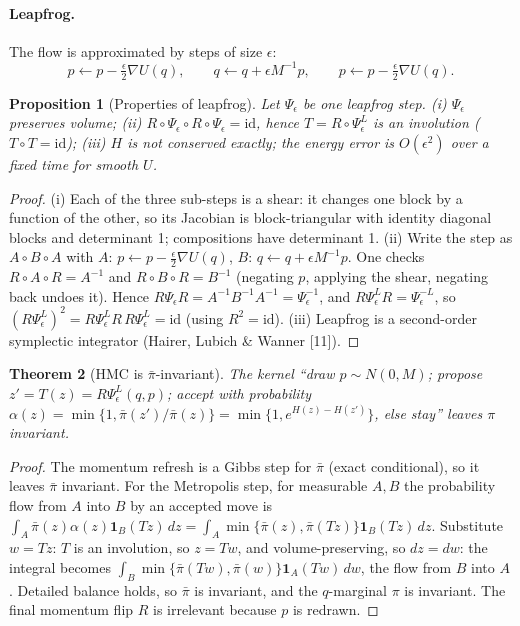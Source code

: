 \documentclass[11pt]{article}
\newtheorem{theorem}{Theorem}[section]
\newtheorem{proposition}[theorem]{Proposition}
\theoremstyle{definition}
\theoremstyle{remark}
\newcommand{\one}{\mathbf 1}
\begin{document}
\paragraph{Leapfrog.} The flow is approximated by steps of size $\epsilon$:
\[
p\leftarrow p-\tfrac\epsilon2\nabla U(q),\qquad q\leftarrow q+\epsilon M^{-1}p,\qquad p\leftarrow p-\tfrac\epsilon2\nabla U(q).
\]
\begin{proposition}[Properties of leapfrog]\label{prop:leapfrog}
Let $\Psi_\epsilon$ be one leapfrog step. (i) $\Psi_\epsilon$ preserves volume; (ii) $R\circ\Psi_\epsilon\circ R\circ\Psi_\epsilon=\mathrm{id}$, hence $T=R\circ\Psi_\epsilon^L$ is an involution ($T\circ T=\mathrm{id}$); (iii) $H$ is not conserved exactly; the energy error is $O(\epsilon^2)$ over a fixed time for smooth $U$.
\end{proposition}
\begin{proof}
(i) Each of the three sub-steps is a shear: it changes one block by a function of the other, so its Jacobian is block-triangular with identity diagonal blocks and determinant 1; compositions have determinant 1. (ii) Write the step as $A\circ B\circ A$ with $A$: $p\leftarrow p-\frac\epsilon2\nabla U(q)$, $B$: $q\leftarrow q+\epsilon M^{-1}p$. One checks $R\circ A\circ R=A^{-1}$ and $R\circ B\circ R=B^{-1}$ (negating $p$, applying the shear, negating back undoes it). Hence $R\Psi_\epsilon R=A^{-1}B^{-1}A^{-1}=\Psi_\epsilon^{-1}$, and $R\Psi^L_\epsilon R=\Psi_\epsilon^{-L}$, so $(R\Psi^L_\epsilon)^2=R\Psi^L_\epsilon R\,R\Psi^L_\epsilon=\mathrm{id}$ (using $R^2=\mathrm{id}$). (iii) Leapfrog is a second-order symplectic integrator (Hairer, Lubich \& Wanner [11]).
\end{proof}

\begin{theorem}[HMC is $\bar\pi$-invariant]\label{thm:hmc}
The kernel ``draw $p\sim N(0,M)$; propose $z'=T(z)=R\Psi_\epsilon^L(q,p)$; accept with probability $\alpha(z)=\min\{1,\bar\pi(z')/\bar\pi(z)\}=\min\{1,e^{H(z)-H(z')}\}$, else stay'' leaves $\pi$ invariant.
\end{theorem}
\begin{proof}
The momentum refresh is a Gibbs step for $\bar\pi$ (exact conditional), so it leaves $\bar\pi$ invariant. For the Metropolis step, for measurable $A,B$ the probability flow from $A$ into $B$ by an accepted move is $\int_A\bar\pi(z)\alpha(z)\one_B(Tz)\,dz=\int_A\min\{\bar\pi(z),\bar\pi(Tz)\}\one_B(Tz)\,dz$. Substitute $w=Tz$: $T$ is an involution, so $z=Tw$, and volume-preserving, so $dz=dw$: the integral becomes $\int_B\min\{\bar\pi(Tw),\bar\pi(w)\}\one_A(Tw)\,dw$, the flow from $B$ into $A$. Detailed balance holds, so $\bar\pi$ is invariant, and the $q$-marginal $\pi$ is invariant. The final momentum flip $R$ is irrelevant because $p$ is redrawn.
\end{proof}
\end{document}
